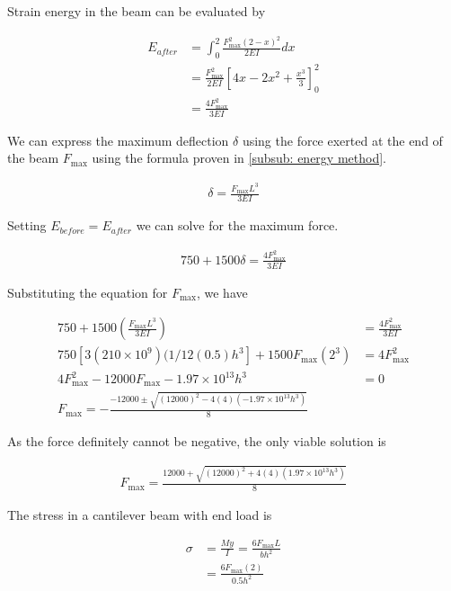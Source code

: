 \documentclass[
10pt,
a4paper,
openany,
svgnames,
]{book}
\begin{document}
\begin{exercises}
  Strain energy in the beam can be evaluated by

  \begin{align*}
    E_{after} &= \int_0^2 \frac{F_{\max}^2(2-x)^2}{2EI} dx \\
              &= \frac{F_{\max}^2}{2EI} \left[ 4x - 2x^2 + \frac{x^3}{3} \right]_0^2 \\
              &=  \frac{4F_{\max}^2}{3EI}
  \end{align*}

  We can express the maximum deflection $\delta$ using the force exerted at the end of the beam $F_{\max}$ using the formula proven in \ref{subsub: energy method}.

  \begin{align*}
    \delta = \frac{F_{\max}L^3}{3EI}
  \end{align*}

  Setting $E_{before} = E_{after}$ we can solve for the maximum force. 

  \begin{align*}
    750 + 1500\delta = \frac{4F_{\max}^2}{3EI}
  \end{align*}

  Substituting the equation for $F_{\max}$, we have

  \begin{align*}
    750 + 1500 \left( \frac{ F_{\max}L^3 }{3EI} \right) &= \frac{ 4F_{\max}^2 }{3EI} \\
    750 \left[ 3 (210 \times 10^9)(1/12 (0.5)h^3 \right] + 1500 F_{\max} \left( 2^3 \right) &= 4 F_{\max}^2 \\
    4F_{\max}^2 - 12000F_{\max} - 1.97 \times 10^{13}h^3 &= 0 \\
    F_{\max} = - \frac{-12000 \pm \sqrt{ (12000)^2 - 4(4)(-1.97 \times 10^{13}h^3)}}{8}
  \end{align*}

  As the force definitely cannot be negative, the only viable solution is

  \begin{align*}
    F_{\max} = \frac{12000 + \sqrt{ (12000)^2 + 4(4)(1.97 \times 10^{13}h^3)}}{8}
  \end{align*}

  The stress in a cantilever beam with end load is 

  \begin{align*}
    \sigma &= \frac{My}{I} = \frac{6F_{\max}L}{bh^2} \\
           &= \frac{6F_{\max}(2)}{0.5h^2}
  \end{align*}


\end{exercises}
\end{document}
